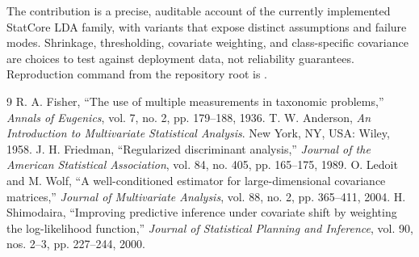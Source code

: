\documentclass[conference]{IEEEtran}
\begin{document}
The contribution is a precise, auditable account of the currently implemented StatCore LDA family, with variants that expose distinct assumptions and failure modes. Shrinkage, thresholding, covariate weighting, and class-specific covariance are choices to test against deployment data, not reliability guarantees. Reproduction command from the repository root is .

\begin{thebibliography}{9}
 R. A. Fisher, ``The use of multiple measurements in taxonomic problems,'' \emph{Annals of Eugenics}, vol. 7, no. 2, pp. 179--188, 1936.
 T. W. Anderson, \emph{An Introduction to Multivariate Statistical Analysis}. New York, NY, USA: Wiley, 1958.
 J. H. Friedman, ``Regularized discriminant analysis,'' \emph{Journal of the American Statistical Association}, vol. 84, no. 405, pp. 165--175, 1989.
 O. Ledoit and M. Wolf, ``A well-conditioned estimator for large-dimensional covariance matrices,'' \emph{Journal of Multivariate Analysis}, vol. 88, no. 2, pp. 365--411, 2004.
 H. Shimodaira, ``Improving predictive inference under covariate shift by weighting the log-likelihood function,'' \emph{Journal of Statistical Planning and Inference}, vol. 90, nos. 2--3, pp. 227--244, 2000.
\end{thebibliography}
\end{document}

